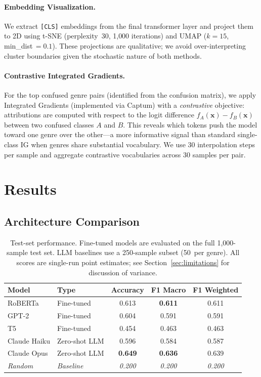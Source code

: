 \documentclass[11pt,a4paper]{article}
\begin{document}
\paragraph{Embedding Visualization.}
We extract \texttt{[CLS]} embeddings from the final transformer layer
and project them to 2D using t-SNE
\citep{vandermaaten2008visualizing} (perplexity~30, 1{,}000 iterations)
and UMAP \citep{mcinnes2018umap} ($k=15$, min\_dist$\,=0.1$).
These projections are qualitative; we avoid over-interpreting cluster
boundaries given the stochastic nature of both methods.

\paragraph{Contrastive Integrated Gradients.}
For the top confused genre pairs (identified from the confusion matrix),
we apply Integrated Gradients \citep{sundararajan2017axiomatic}
(implemented via Captum) with a
\emph{contrastive} objective: attributions are computed with respect to
the logit difference $f_A(\mathbf{x}) - f_B(\mathbf{x})$ between two
confused classes $A$ and $B$.
This reveals which tokens push the model toward one genre over the
other---a more informative signal than standard single-class IG when
genres share substantial vocabulary.
We use 30 interpolation steps per sample and aggregate contrastive
vocabularies across 30 samples per pair.


\section{Results}
\label{sec:results}

\subsection{Architecture Comparison}

\begin{table}[t]
\centering
\caption{Test-set performance. Fine-tuned models are evaluated on the
full 1{,}000-sample test set. LLM baselines use a 250-sample subset
(50~per genre). All scores are single-run point estimates; see
Section~\ref{sec:limitations} for discussion of variance.}
\label{tab:results}
\begin{tabular}{llccc}
\toprule
\textbf{Model} & \textbf{Type} & \textbf{Accuracy} &
\textbf{F1 Macro} & \textbf{F1 Weighted} \\
\midrule
RoBERTa & Fine-tuned & 0.613 & \textbf{0.611} & 0.611 \\
GPT-2 & Fine-tuned & 0.604 & 0.591 & 0.591 \\
T5 & Fine-tuned & 0.454 & 0.463 & 0.463 \\
\midrule
Claude Haiku & Zero-shot LLM & 0.596 & 0.584 & 0.587 \\
Claude Opus & Zero-shot LLM & \textbf{0.649} & \textbf{0.636} & 0.639 \\
\midrule
\textit{Random} & \textit{Baseline} & \textit{0.200} & \textit{0.200}
& \textit{0.200} \\
\bottomrule
\end{tabular}
\end{table}
\end{document}
